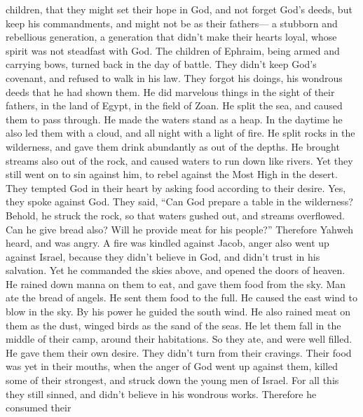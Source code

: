 children,  that they might set their hope in God, and not
forget God's deeds, but keep his commandments,  and might
not be as their fathers--- a stubborn and rebellious generation, a
generation that didn't make their hearts loyal, whose spirit was not
steadfast with God.  The children of Ephraim, being armed
and carrying bows, turned back in the day of battle.  They
didn't keep God's covenant, and refused to walk in his law.
 They forgot his doings, his wondrous deeds that he had
shown them.  He did marvelous things in the sight of their
fathers, in the land of Egypt, in the field of Zoan.  He
split the sea, and caused them to pass through. He made the waters stand
as a heap.  In the daytime he also led them with a cloud,
and all night with a light of fire.  He split rocks in the
wilderness, and gave them drink abundantly as out of the depths.
 He brought streams also out of the rock, and caused waters
to run down like rivers.  Yet they still went on to sin
against him, to rebel against the Most High in the desert. 
They tempted God in their heart by asking food according to their
desire.  Yes, they spoke against God. They said, ``Can God
prepare a table in the wilderness?  Behold, he struck the
rock, so that waters gushed out, and streams overflowed. Can he give
bread also? Will he provide meat for his people?'' 
Therefore Yahweh heard, and was angry. A fire was kindled against Jacob,
anger also went up against Israel,  because they didn't
believe in God, and didn't trust in his salvation.  Yet he
commanded the skies above, and opened the doors of heaven. 
He rained down manna on them to eat, and gave them food from the sky.
 Man ate the bread of angels. He sent them food to the
full.  He caused the east wind to blow in the sky. By his
power he guided the south wind.  He also rained meat on
them as the dust, winged birds as the sand of the seas.  He
let them fall in the middle of their camp, around their habitations.
 So they ate, and were well filled. He gave them their own
desire.  They didn't turn from their cravings. Their food
was yet in their mouths,  when the anger of God went up
against them, killed some of their strongest, and struck down the young
men of Israel.  For all this they still sinned, and didn't
believe in his wondrous works.  Therefore he consumed their
